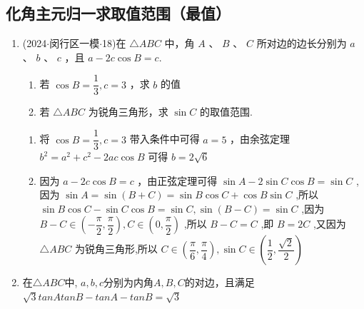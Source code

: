 \subsection*{化角主元归一求取值范围（最值）}
\begin{enumerate}
    \item (2024$\cdot$闵行区一模$\cdot$18)在 $\bigtriangleup  {ABC}$ 中，角 $A$ 、 $B$ 、 $C$ 所对边的边长分别为 $a$ 、 $b$ 、 $c$ ，且 $a - {2c}\cos B = c$.
    \begin{enumerate}
        \item 若 $\cos B = \dfrac{1}{3},c = 3$ ，求 $b$ 的值
        \item 若 $\bigtriangleup  {ABC}$ 为锐角三角形，求 $\sin C$ 的取值范围.
    \end{enumerate}
    \begin{jieda}
        \begin{enumerate}
            \item 将 $\cos B = \dfrac{1}{3},c = 3$ 带入条件中可得 $a = 5$ ，由余弦定理 ${b}^{2} = {a}^{2} + {c}^{2} - {2ac}\cos B$ 可得 $b = 2\sqrt{6}$
            \item 因为 $a - {2c}\cos B = c$ ，由正弦定理可得 $\sin A - 2\sin C\cos B =  \sin C$ ,因为 $\sin A = \sin \left( {B + C}\right)  = \sin B\cos C + \cos B\sin C$ ,所以 $\sin B\cos C - \sin C\cos B = \sin C,\sin \left( {B - C}\right)  = \sin C$ ,因为 $B -  C \in  \left( {-\dfrac{\pi }{2},\dfrac{\pi }{2}}\right) ,C \in  \left( {0,\dfrac{\pi }{2}}\right)$ ,所以 $B - C = C$ ,即 $B = {2C}$ ,又因为 $\bigtriangleup {ABC}$ 为锐角三角形,所以 $C \in  \left( {\dfrac{\pi }{6},\dfrac{\pi }{4}}\right) ,\sin C \in  \left( {\dfrac{1}{2},\dfrac{\sqrt{2}}{2}}\right)$
        \end{enumerate}
    \end{jieda}
    \item 在$\triangle{ABC}$中, $a,b,c$分别为内角$A,B,C$的对边，且满足$\sqrt{3}tanAtanB - tanA - tanB = \sqrt{3}$


\end{enumerate}
